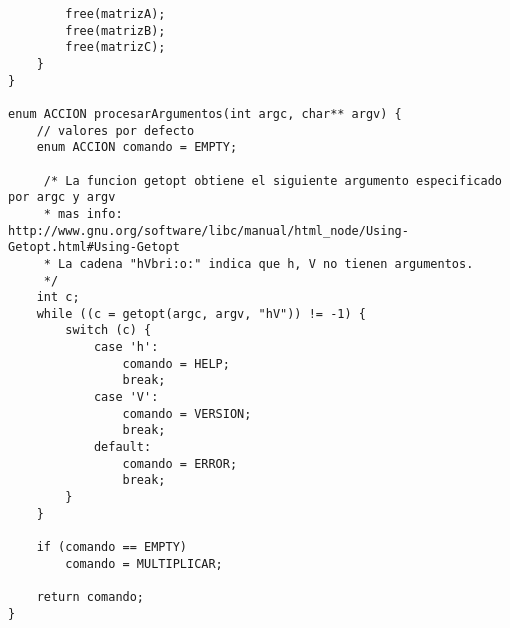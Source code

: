 \documentclass[a4paper,10pt]{article}
\begin{document}
\begin{lstlisting}
		free(matrizA);
		free(matrizB);
		free(matrizC);
	}
}

enum ACCION procesarArgumentos(int argc, char** argv) {
	// valores por defecto
	enum ACCION comando = EMPTY;
	
	 /* La funcion getopt obtiene el siguiente argumento especificado por argc y argv
	 * mas info: http://www.gnu.org/software/libc/manual/html_node/Using-Getopt.html#Using-Getopt
	 * La cadena "hVbri:o:" indica que h, V no tienen argumentos.
	 */
	int c;
	while ((c = getopt(argc, argv, "hV")) != -1) {
		switch (c) {
			case 'h':
				comando = HELP;
				break;
			case 'V':
				comando = VERSION;
				break;
			default:
				comando = ERROR;
				break;
		}
	}

	if (comando == EMPTY)
		comando = MULTIPLICAR;

	return comando;
}
\end{lstlisting}
\pagebreak
\end{document}
